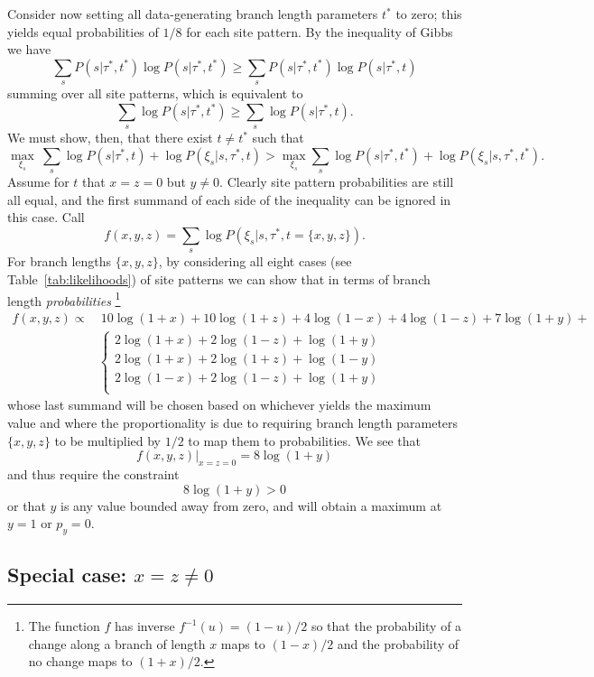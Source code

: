 Consider now setting all data-generating branch length parameters $t^*$ to zero; this yields equal probabilities of $1/8$ for each site pattern.
By the inequality of Gibbs we have
$$
\sum_{s} P(s|\tau^*,t^*)\log P(s|\tau^*,t^*) \geq \sum_{s} P(s|\tau^*,t^*)\log P(s|\tau^*,t)
$$
summing over all site patterns, which is equivalent to
$$
\sum_{s} \log P(s|\tau^*,t^*) \geq \sum_{s} \log P(s|\tau^*,t).
$$
We must show, then, that there exist $t\neq t^*$ such that
$$
\max_{\xi_s} \ \sum_{s} \log P(s | \tau^*, t) + \log P(\xi_s | s, \tau^*, t) > \max_{\xi_s} \sum_{s} \log P(s | \tau^*, t^*) + \log P(\xi_s | s, \tau^*, t^*).
$$
Assume for $t$ that $x=z=0$ but $y\neq 0$.
Clearly site pattern probabilities are still all equal, and the first summand of each side of the inequality can be ignored in this case.
Call
$$
f(x,y,z) = \sum_{s} \log P(\xi_s | s, \tau^*, t=\{x,y,z\}).
$$
For branch lengths $\{x,y,z\}$, by considering all eight cases (see Table~\ref{tab:likelihoods}) of site patterns we can show that in terms of branch length \emph{probabilities}%
    \footnote{The function $f$ has inverse $f^{-1}(u)=(1-u)/2$ so that the probability of a change along a branch of length $x$ maps to $(1-x)/2$ and the probability of no change maps to $(1+x)/2$.}
\begin{align}
f(x,y,z) \propto & \ 10\log(1+x)+10\log(1+z)+4\log(1-x)+4\log(1-z)+7\log(1+y)+\\
& \left\{ 
  \begin{array}{l}
  2\log(1+x)+2\log(1-z)+\log(1+y)\\
  2\log(1+x)+2\log(1+z)+\log(1-y)\\
  2\log(1-x)+2\log(1-z)+\log(1+y)\\
  \end{array} \right.
\end{align}
whose last summand will be chosen based on whichever yields the maximum value and where the proportionality is due to requiring branch length parameters $\{x,y,z\}$ to be multiplied by $1/2$ to map them to probabilities.
We see that
$$
f(x,y,z)|_{x=z=0} = 8\log(1+y)
$$
and thus require the constraint
$$
8\log(1+y) > 0
$$
or that $y$ is any value bounded away from zero, and will obtain a maximum at $y=1$ or $p_y=0$.

\subsection{Special case: $x=z\neq 0$}


